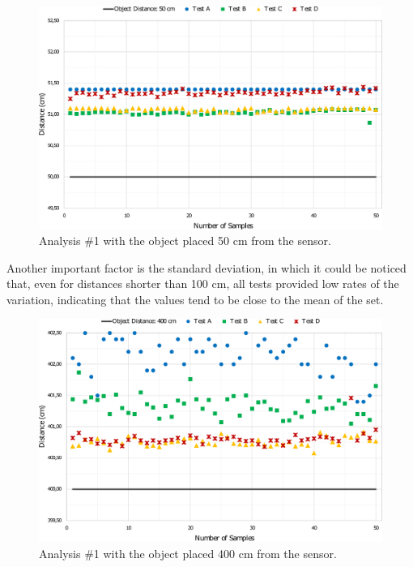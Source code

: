 \begin{figure}[h!]
    \centering
    \includegraphics[scale=0.5]{images/Results/testing_methodology/50cm.pdf}
    \caption{Analysis \#1 with the object placed 50 cm from the sensor.}
    \label{fig:50cmText}
\end{figure}

Another important factor is the standard deviation, in which it could be noticed that, even for distances shorter than 100 cm, all tests provided low rates of the variation, indicating that the values tend to be close to the mean of the set. 

\begin{figure}[h!]
    \centering
    \includegraphics[scale=0.5]{images/Results/testing_methodology/400cm.pdf}
    \caption{Analysis \#1 with the object placed 400 cm from the sensor.}
    \label{fig:400cmText}
\end{figure}


